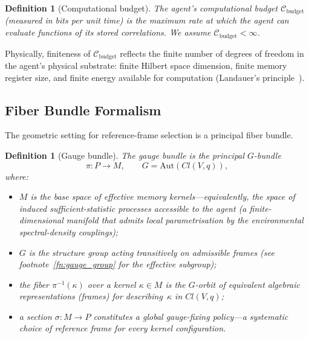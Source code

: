 \documentclass[12pt]{article}
\newtheorem{definition}[theorem]{Definition}
\begin{document}
\begin{definition}[Computational budget]
\label{def:budget}
The agent's \emph{computational budget}
$\mathcal{C}_{\mathrm{budget}}$ (measured in bits per unit
time) is the maximum rate at which the agent can evaluate
functions of its stored correlations.
We assume $\mathcal{C}_{\mathrm{budget}} < \infty$.
\end{definition}

Physically, finiteness of $\mathcal{C}_{\mathrm{budget}}$
reflects the finite number of degrees of freedom in the
agent's physical substrate: finite Hilbert space dimension,
finite memory register size, and finite energy available for
computation (Landauer's
principle~\cite{Landauer1961,Bennett1982}).

\subsection{Fiber Bundle Formalism}
\label{subsec:fiber}

The geometric setting for reference-frame selection is a
principal fiber bundle.

\begin{definition}[Gauge bundle]
\label{def:bundle}
The \emph{gauge bundle} is the principal $G$-bundle
\begin{equation}
\label{eq:bundle}
\pi: P \to M, \qquad G = \mathrm{Aut}(Cl(V,q)),
\end{equation}
where:
\begin{itemize}
\item $M$ is the base space of \emph{effective memory
  kernels}---equivalently, the space of induced
  sufficient-statistic processes accessible to the agent
  (a finite-dimensional manifold that admits local
  parametrisation by the environmental spectral-density
  couplings);
\item $G$ is the structure group acting transitively on
  admissible frames (see
  footnote~\ref{fn:gauge_group} for the effective
  subgroup);
\item the fiber $\pi^{-1}(\kappa)$ over a kernel
  $\kappa \in M$ is the $G$-orbit of equivalent algebraic
  representations (frames) for describing~$\kappa$
  in $Cl(V,q)$;
\item a \emph{section} $\sigma: M \to P$ constitutes a
  global gauge-fixing policy---a systematic choice
  of reference frame for every kernel configuration.
\end{itemize}
\end{definition}
\end{document}
